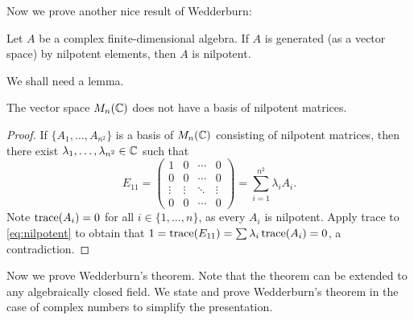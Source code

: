 Now we prove another nice result of Wedderburn:

\begin{theorem}[Wedderburn]
\label{thm:Wedderburn}
    Let $A$ be a complex finite-dimensional 
    algebra. If $A$ is generated (as a vector space) 
    by nilpotent elements, then $A$ is nilpotent. 
\end{theorem}

We shall need a lemma.

\begin{lemma}
    The vector space $M_n(\mathbb{C})$ does not have a basis of nilpotent matrices. 
\end{lemma}

\begin{proof}
    If $\{A_1,\dots,A_{n^2}\}$ is a basis of 
    $M_n(\mathbb{C})$ consisting of nilpotent matrices, 
    then there exist $\lambda_1,\dots,\lambda_{n^2}\in\mathbb{C}$ such that 
    \begin{equation}
        \label{eq:nilpotent}
        E_{11}=\begin{pmatrix}
        1&0&\cdots&0\\
        0&0&\cdots&0\\
        \vdots&\vdots&\ddots&\vdots\\
        0&0&\cdots&0
        \end{pmatrix}
        =\sum_{i=1}^{n^2}\lambda_iA_i.
    \end{equation}
    Note $\operatorname{trace}(A_i)=0$ for all $i\in\{1,\dots,n\}$, as 
    every $A_i$ is nilpotent. 
    Apply trace to \eqref{eq:nilpotent} to 
    obtain that $1=\operatorname{trace}(E_{11})=\sum\lambda_i\operatorname{trace}(A_i)=0$, a contradiction. 
\end{proof}

Now we prove Wedderburn's theorem. Note that
the theorem can be extended to any algebraically closed field. We 
state and prove Wedderburn's theorem in the case of complex numbers
to simplify the presentation. 

